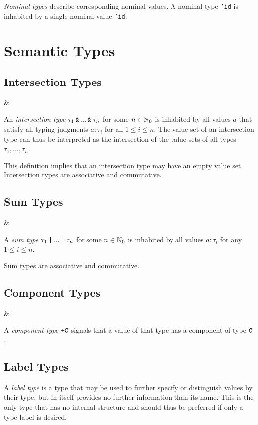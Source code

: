 \noindent \textit{Nominal types} describe corresponding nominal values. A nominal type \texttt{'id} is inhabited by a single nominal value \texttt{'id}.



\section{Semantic Types}

\subsection{Intersection Types}

\begin{grammar}
 &\produce {}
\end{grammar}

\noindent An \textit{intersection type} $\tau_1 \mathbin{\texttt{\&}} ... \mathbin{\texttt{\&}} \tau_n$ for some $n \in \mathbb{N}_0$ is inhabited by all values $a$ that satisfy all typing judgments $a : \tau_i$ for all $1 \leq i \leq n$. The value set of an intersection type can thus be interpreted as the intersection of the value sets of all types $\tau_1, ..., \tau_n$.

This definition implies that an intersection type may have an empty value set. Intersection types are associative and commutative.


\subsection{Sum Types}

\begin{grammar}
 &\produce {}
\end{grammar}

\noindent A \textit{sum type} $\tau_1 \mathbin{\texttt{|}} ... \mathbin{\texttt{|}} \tau_n$ for some $n \in \mathbb{N}_0$ is inhabited by all values $a : \tau_i$ for any $1 \leq i \leq n$. 

Sum types are associative and commutative.


\subsection{Component Types}

\begin{grammar}
 &\produce {}
\end{grammar}

\noindent A \textit{component type} $\texttt{+C}$ signals that a value of that type has a component of type $\texttt{C}$.


\subsection{Label Types}

\noindent A \textit{label type} is a type that may be used to further specify or distinguish values by their type, but in itself provides no further information than its name. This is the only type that has no internal structure and should thus be preferred if only a type label is desired.


